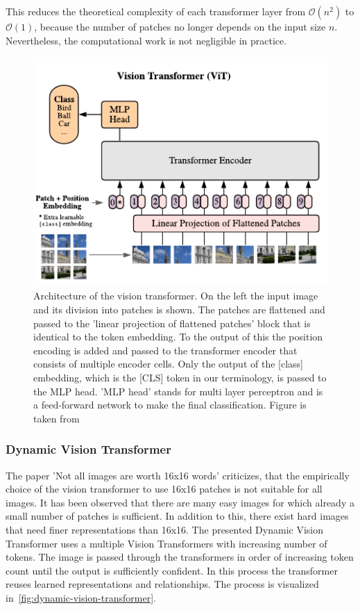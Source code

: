 \documentclass[a4paper]{scrartcl}
\begin{document}
    This reduces the theoretical complexity of each transformer layer from $\mathcal{O}(n^2)$ to $\mathcal{O}(1)$, because the number of patches no longer depends on the input size $n$.
    Nevertheless, the computational work is not negligible in practice.

    \begin{figure}[btp]
        \centering
        \includegraphics[width=0.55\linewidth]{img/VisionTransformerArchitecture}
        \caption[Vision Transformer Architecture]{Architecture of the vision transformer.
        On the left the input image and its division into patches is shown.
        The patches are flattened and passed to the 'linear projection of flattened patches' block that is identical to the token embedding.
        To the output of this the position encoding is added and passed to the transformer encoder that consists of multiple encoder cells.
        Only the output of the [class] embedding, which is the [CLS] token in our terminology, is passed to the MLP head.
        'MLP head' stands for multi layer perceptron and is a feed-forward network to make the final classification.
        Figure is taken from~\cite{dosovitskiy2021image}}
        \label{fig:visionTransformerArchitecture}
    \end{figure}

    \subsubsection{Dynamic Vision Transformer}\label{subsubsec:dynamic-vision-transformer}
    The paper 'Not all images are worth 16x16 words' criticizes, that the empirically choice of the vision transformer to use 16x16 patches is not suitable for all images.
    It has been observed that there are many easy images for which already a small number of patches is sufficient.
    In addition to this, there exist hard images that need finer representations than 16x16.
    The presented Dynamic Vision Transformer uses a multiple Vision Transformers with increasing number of tokens.
    The image is passed through the transformers in order of increasing token count until the output is sufficiently confident.
    In this process the transformer reuses learned representations and relationships.
    The process is visualized in~\ref{fig:dynamic-vision-transformer}.
\end{document}
